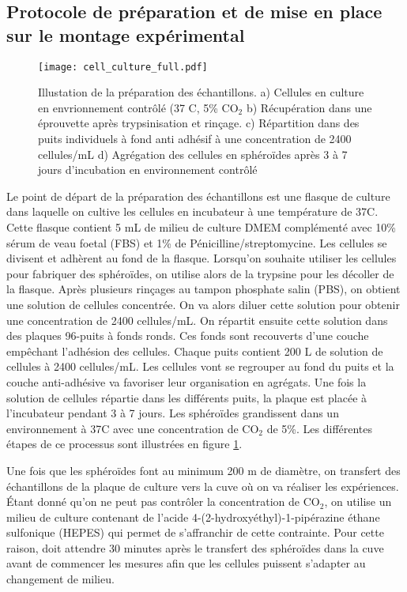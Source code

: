 \subsection{Protocole de préparation et de mise en place sur le montage expérimental} 
\label{Protocole}
\begin{figure}[ht!]
\texttt{[image: cell\_culture\_full.pdf]}
\caption{Illustation de la préparation des échantillons. a) Cellules  en culture en envrionnement contrôlé (37 \textdegree C, 5\% CO$_2$ b)  Récupération dans une éprouvette après trypsinisation et rinçage. c) Répartition dans des puits individuels à fond anti adhésif à une concentration de 2400 cellules/mL d) Agrégation des cellules en sphéroïdes après 3 à 7 jours d'incubation en environnement contrôlé \label{prepa_sphero} }
\end{figure}

Le point de départ de la préparation des échantillons est une flasque de culture dans laquelle on cultive les cellules en incubateur à une température de 37\textdegree C. Cette flasque contient 5 mL de milieu de culture DMEM complémenté avec 10\% sérum de veau foetal (FBS) et  1\% de Pénicilline/streptomycine. Les cellules se divisent et adhèrent au fond de la flasque. Lorsqu'on souhaite utiliser les cellules pour fabriquer des sphéroïdes, on utilise alors de la trypsine pour les décoller de la flasque. Après plusieurs rinçages au tampon phosphate salin (PBS), on obtient une solution de cellules concentrée. On va alors  diluer cette solution pour obtenir une concentration de 2400 cellules/mL. On répartit ensuite cette solution dans des plaques 96-puits à fonds ronds. Ces fonds sont recouverts d'une couche empêchant l'adhésion des cellules. Chaque puits contient 200 \textmu L  de solution de cellules à 2400 cellules/mL. Les cellules vont se regrouper au fond du puits et la couche anti-adhésive va favoriser leur organisation en agrégats. Une fois la solution de cellules répartie dans les différents puits, la plaque est placée à l'incubateur pendant 3 à 7 jours. Les sphéroïdes grandissent dans un environnement à 37\textdegree C avec une concentration de CO$_2$ de 5\%.\cite{Carlotta2017} Les différentes étapes de ce processus sont illustrées en figure \ref{prepa_sphero}.

Une fois que les sphéroïdes font au minimum 200 \textmu m de diamètre, on transfert des échantillons de la plaque de culture vers la cuve où on va réaliser les expériences. Étant donné qu'on ne peut pas contrôler la concentration de CO$_2$, on  utilise un milieu  de culture contenant de l'acide 4-(2-hydroxyéthyl)-1-pipérazine éthane sulfonique (HEPES) qui permet de s'affranchir de cette contrainte. Pour cette raison, doit attendre 30 minutes après le transfert des sphéroïdes dans la cuve avant de commencer les mesures afin que les cellules puissent s'adapter au changement de milieu.\cite{Taylor1962} 

